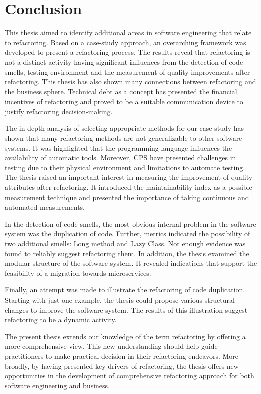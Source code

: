 \chapter{Conclusion}
This thesis aimed to identify additional areas in software engineering that relate to refactoring. Based on a case-study approach, an overarching framework was developed to present a refactoring process. The results reveal that refactoring is not a distinct activity having significant influences from the detection of code smells, testing environment and the measurement of quality improvements after refactoring. This thesis has also shown many connections between refactoring and the business sphere. Technical debt as a concept has presented the financial incentives of refactoring and proved to be a suitable communication device to justify refactoring decision-making. 

The in-depth analysis of selecting appropriate methods for our case study has shown that many refactoring methods are not generalizable to other software systems. It was highlighted that the programming language influences the availability of automatic tools. Moreover, CPS have presented challenges in testing due to their physical environment and limitations to automate testing. The thesis raised an important interest in measuring the improvement of quality attributes after refactoring. It introduced the maintainability index as a possible measurement technique and presented the importance of taking continuous and automated measurements.

In the detection of code smells, the most obvious internal problem in the software system was the duplication of code. Further, metrics indicated the possibility of two additional smells: Long method and Lazy Class. Not enough evidence was found to reliably suggest refactoring them. In addition, the thesis examined the modular structure of the software system. It revealed indications that support the feasibility of a migration towards microservices. 

Finally, an attempt was made to illustrate the refactoring of code duplication. Starting with just one example, the thesis could propose various structural changes to improve the software system. The results of this illustration suggest refactoring to be a dynamic activity.

The present thesis extends our knowledge of the term refactoring by offering a more comprehensive view. This new understanding should help guide practitioners to make practical decision in their refactoring endeavors. More broadly, by having presented key drivers of refactoring, the thesis offers new opportunities in the development of comprehensive refactoring approach for both software engineering and business. 